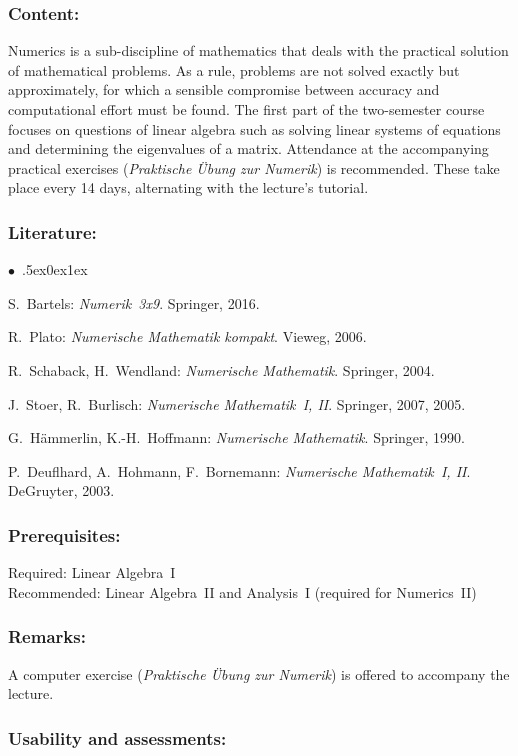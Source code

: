 \documentclass[a4paper,10pt]{article}
\renewenvironment{itemize}{\begin{list}{$\bullet$\ }{\itemsep.5ex\setlength{\topsep}{0.5\itemsep}\parsep0ex\labelsep1ex\settowidth{\labelwidth}{$\bullet$\ }\setlength{\leftmargin}{\labelwidth}\addtolength{\leftmargin}{3ex}\addtolength{\leftmargin}{\labelsep}}}{\end{list}}
\begin{document}
\subsubsection*{\large
    Content:
}
Numerics is a sub-discipline of mathematics that deals with the practical solution of mathematical problems. As a rule, problems are not solved exactly but approximately, for which a sensible compromise between accuracy and computational effort must be found. The first part of the two-semester course focuses on questions of linear algebra such as solving linear systems of equations and determining the eigenvalues of a matrix. Attendance at the accompanying practical exercises ({\em Praktische Übung zur Numerik}) is recommended. These take place every 14 days, alternating with the lecture's tutorial.
\subsubsection*{\large
    Literature:
}
\begin{itemize}
\item
S.~Bartels: \emph{Numerik~3x9}. Springer, 2016.
\item
R.~Plato: \emph{Numerische Mathematik kompakt}. Vieweg, 2006.
\item
R.~Schaback, H.~Wendland: \emph{Numerische Mathematik}. Springer, 2004.
\item
J.~Stoer, R.~Burlisch: \emph{Numerische Mathematik~I, II}. Springer, 2007, 2005.
\item
G.~Hämmerlin, K.-H.~Hoffmann: \emph{Numerische Mathematik}. Springer, 1990.
\item
P.~Deuflhard, A.~Hohmann, F.~Bornemann: \emph{Numerische Mathematik~I, II}. DeGruyter, 2003.
\end{itemize}
\subsubsection*{\large
    Prerequisites:
}
Required: Linear Algebra~I \\
Recommended: Linear Algebra~II and Analysis~I (required for Numerics~II)
\subsubsection*{\large
    Remarks:
}
A computer exercise ({\em Praktische Übung zur Numerik}) is offered to accompany the lecture.
\cleardoublepage
\subsubsection*{\large
    Usability and assessments:
}
\end{document}
